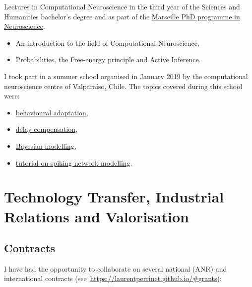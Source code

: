 \documentclass[10pt,english,a4paper,oneside]{article}%
\newcommand{\years}[1]{\marginpar{\textit{\scriptsize #1}}}
\begin{document}
Lectures in Computational Neuroscience in the third year of the Sciences and Humanities bachelor's degree\years{2019} and as part of the \href{https://laurentperrinet.github.io/post/2018-03-26-cours-neuro-comp-fep/}{Marseille PhD programme in Neuroscience}\years{2018}.

\begin{itemize}
	\item An introduction to the field of Computational Neuroscience,
	\item Probabilities, the Free-energy principle and Active Inference.
\end{itemize}


I took part in a summer school organised in January 2019 by the computational neuroscience centre of Valparaíso, Chile. The topics covered during this school were:
\begin{itemize}
	\item \href{https://laurentperrinet.github.io/talk/2019-01-18-laconeu/}{behavioural adaptation},
	\item \href{https://laurentperrinet.github.io/talk/2019-01-17-laconeu/}{delay compensation},
	\item \href{https://laurentperrinet.github.io/talk/2019-01-16-laconeu/}{Bayesian modelling},
	\item \href{https://laurentperrinet.github.io/talk/2019-01-14-laconeu/}{tutorial on spiking network modelling}.

\end{itemize}


\section{Technology Transfer, Industrial Relations and Valorisation} %

\subsection{Contracts} %
I have had the opportunity to collaborate on several national (ANR) and international contracts (see~\url{https://laurentperrinet.github.io/#grants}):
\end{document}
